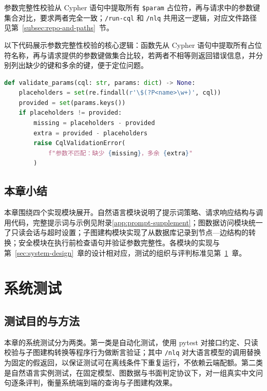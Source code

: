 \documentclass[12pt,a4paper]{article}
\begin{document}
参数完整性校验从 Cypher 语句中提取所有 \texttt{\$param} 占位符，再与请求中的参数键集合对比，要求两者完全一致；\texttt{/run-cql} 和 \texttt{/nlq} 共用这一逻辑，对应文件路径见第~\ref{subsec:repo-and-paths}~节。

以下代码展示参数完整性校验的核心逻辑：函数先从 Cypher 语句中提取所有占位符名称，再与请求提供的参数键做集合比较，若两者不相等则返回错误信息，并分别列出缺少的键和多余的键，便于定位问题。

\begin{lstlisting}[language=Python, caption={参数一致性校验（cql\_validator.py 摘录）}]
def validate_params(cql: str, params: dict) -> None:
    placeholders = set(re.findall(r'\$(?P<name>\w+)', cql))
    provided = set(params.keys())
    if placeholders != provided:
        missing = placeholders - provided
        extra = provided - placeholders
        raise CqlValidationError(
            f"参数不匹配：缺少 {missing}，多余 {extra}"
        )
\end{lstlisting}

\subsection{本章小结}

本章围绕四个实现模块展开。自然语言模块说明了提示词策略、请求响应结构与调用代码，完整提示词与示例见附录\ref{app:prompt-supplement}；图数据访问模块统一了只读会话与超时设置；子图建构模块实现了从数据库记录到节点—边结构的转换；安全模块在执行前检查语句并验证参数完整性。各模块的实现与第~\ref{sec:system-design}~章的设计相对应，测试的组织与评判标准见第~\ref{sec:system-test}~章。

\newpage

\section{系统测试}
\label{sec:system-test}

\subsection{测试目的与方法}

本章的系统测试分为两类。第一类是自动化测试，使用 pytest 对接口约定、只读校验与子图建构转换等程序行为做断言验证；其中 \texttt{/nlq} 对大语言模型的调用替换为固定的假返回，以保证测试可在离线条件下重复运行，不依赖云端配额。第二类是自然语言实例测试，在固定模型、图数据与书面判定协议下，对一组真实中文问句逐条评判，衡量系统端到端的查询与子图建构效果。
\end{document}
